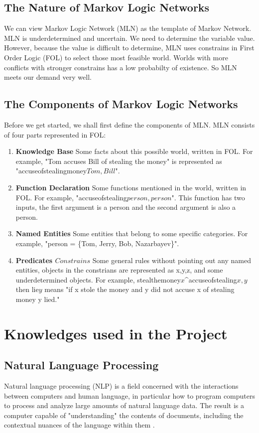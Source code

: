 \documentclass[
12pt, %
a4paper, %
oneside, %
headinclude,footinclude, %
BCOR5mm, %
]{scrartcl}
\begin{document}
\subsection{The Nature of Markov Logic Networks}
We can view Markov Logic Network (MLN) as the template of Markov Network. MLN is underdetermined and uncertain. We need to determine the variable value. However, because the value is difficult to determine, MLN uses constrains in First Order Logic (FOL) to select those most feasible world. Worlds with more conflicts with  stronger constrains has a low probabilty of existence. So MLN meets our demand very well.


\subsection{The Components of Markov Logic Networks}
Before we get started, we shall first define the components of MLN. MLN consists of four parts represented in FOL:
\begin{enumerate}[noitemsep]
    \item \textbf{Knowledge Base} {Some facts about this possible world, written in FOL. For example, "Tom accuses Bill of stealing the money" is represented as "accuseofstealingmoney\(Tom,Bill\)".}
    \item \textbf{Function Declaration} {Some functions mentioned in the world, written in FOL. For example, "accuseofstealing\(person,person\)". This function has two inputs, the first argument is a person and the second argument is also a person.}
    \item \textbf{Named Entities} {Some entities that belong to some specific categories. For example, "person = \{Tom, Jerry, Bob, Nazarbayev\}".}
    \item \textbf{Predicates \(Constrains\)} {Some general rules without pointing out any named entities, objects in the constrians are represented as x,y,z, and some underdetermined objects. For example, stealthemoney\(x\)\^\!accuseofstealing\(x,y\) then lie\(y\) means "if x stole the money and y did not accuse x of stealing money y lied."}
\end{enumerate}



\section{Knowledges used in the Project}
\subsection{Natural Language Processing}
Natural language processing (NLP) is a field concerned with the interactions between computers and human language, in particular how to program computers to process and analyze large amounts of natural language data. The result is a computer capable of "understanding" the contents of documents, including the contextual nuances of the language within them \cite{enwiki:1020063620}.
\end{document}
